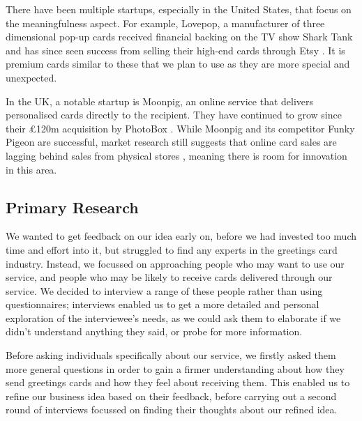 \documentclass[10pt,a4paper]{article}
\begin{document}
There have been multiple startups, especially in the United States, that focus on the meaningfulness aspect. For example, Lovepop, a manufacturer of three dimensional pop-up cards received financial backing on the TV show Shark Tank \citep{americaninno} and has since seen success from selling their high-end cards through Etsy \citep{Etsy}. It is premium cards similar to these that we plan to use as they are more special and unexpected.

In the UK, a notable startup is Moonpig, an online service that delivers personalised cards directly to the recipient. They have continued to grow since their \pounds120m acquisition by PhotoBox \citep{bbc}. While Moonpig and its competitor Funky Pigeon are successful, market research still suggests that online card sales are lagging behind sales from physical stores \citep{mintel}, meaning there is room for innovation in this area.

\subsection*{Primary Research}
We wanted to get feedback on our idea early on, before we had invested too much time and effort into it, but struggled to find any experts in the greetings card industry. Instead, we focussed on approaching people who may want to use our service, and people who may be likely to receive cards delivered through our service. We decided to interview a range of these people rather than using questionnaires; interviews enabled us to get a more detailed and personal exploration of the interviewee's needs, as we could ask them to elaborate if we didn't understand anything they said, or probe for more information.

Before asking individuals specifically about our service, we firstly asked them more general questions in order to gain a firmer understanding about how they send greetings cards and how they feel about receiving them. This enabled us to refine our business idea based on their feedback, before carrying out a second round of interviews focussed on finding their thoughts about our refined idea.
\end{document}
